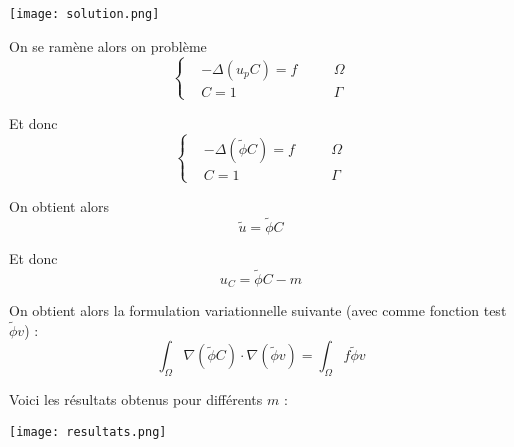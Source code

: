 \begin{minipage}{\linewidth}
	\centering
	\texttt{[image: solution.png]}
\end{minipage}

On se ramène alors on problème
$$\left\{\begin{aligned}
	&-\Delta (u_pC)=f \quad &&\Omega \\
	&C=1 \quad &&\Gamma
\end{aligned}\right.$$

Et donc
$$\left\{\begin{aligned}
	&-\Delta(\tilde{\phi}C)=f \quad &&\Omega \\
	&C=1 \quad &&\Gamma
\end{aligned}\right.$$

On obtient alors
$$\tilde{u}=\tilde{\phi}C$$

Et donc
$$u_C=\tilde{\phi}C-m$$

On obtient alors la formulation variationnelle suivante (avec comme fonction test $\tilde{\phi}v$) :
$$\int_{\Omega}\nabla (\tilde{\phi}C)\cdot\nabla (\tilde{\phi}v)=\int_\Omega f\tilde{\phi}v$$

Voici les résultats obtenus pour différents $m$ :

\begin{minipage}{\linewidth}
	\centering
	\texttt{[image: resultats.png]}
\end{minipage}
